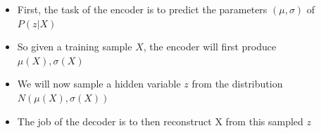 \documentclass[serif,aspectratio=169,dvipsnames]{beamer}
\begin{document}
\begin{frame}
\begin{columns}
\begin{overlayarea}{\textwidth}{\textheight}
		\end{overlayarea}
		\begin{overlayarea}{\textwidth}{\textheight}
			\begin{itemize}\justifying
				\item<1-> First, the task of the encoder is to predict the parameters $(\mu, \sigma)$ of $P(z|X)$
				\item<2-> So given a training sample $X$, the encoder will first produce $\mu(X), \sigma(X)$
				\item<3-> We will now sample a hidden variable $z$ from the distribution $N(\mu(X), \sigma(X))$
				\item<4-> The job of the decoder is to then reconstruct X from this sampled $z$
			\end{itemize}
		\end{overlayarea}
	\end{columns}
\end{frame}
\end{document}
